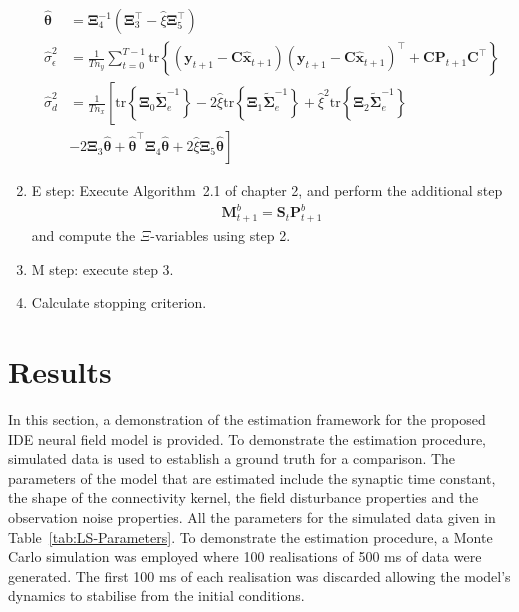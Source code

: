 \documentclass[]{article}
\begin{document}
\begin{algorithm}
\begin{enumerate}
\begin{align}
 \hat{\boldsymbol \theta}&=\boldsymbol\Xi_4^{-1}\left(\boldsymbol\Xi_3^\top-\hat{\xi}\boldsymbol\Xi_5^\top \right)\nonumber\\
\hat{\sigma}_{\epsilon}^2&=\frac{1}{Tn_y}\sum_{t=0}^{T-1}\mathrm{tr}\left\lbrace (\mathbf y_{t+1}-\mathbf C\mathbf{\hat{x}}_{t+1}) (\mathbf y_{t+1}-\mathbf C\mathbf{\hat{x}}_{t+1})^\top+\mathbf C \mathbf P_{t+1}\mathbf C^\top \right\rbrace \nonumber\\
\hat{\sigma}_d^2&=\frac{1}{Tn_x}\left[ \mathrm{tr}\left\lbrace \boldsymbol\Xi_0 \tilde{\boldsymbol\Sigma}_e^{-1}\right\rbrace-
2\hat{\xi}\mathrm{tr}\left\lbrace \boldsymbol\Xi_1 \tilde{\boldsymbol\Sigma}_e^{-1}\right\rbrace +\hat{\xi}^2\mathrm{tr} \left\lbrace\boldsymbol\Xi_2\tilde{\boldsymbol\Sigma}_e^{-1}\right\rbrace\right.\nonumber \\ &\left.-2\boldsymbol\Xi_3\hat{\boldsymbol\theta}+\hat{\boldsymbol\theta}^\top\boldsymbol \Xi_4\hat{\boldsymbol\theta}+2\hat{\xi}\boldsymbol\Xi_5 \hat{\boldsymbol\theta}\right] \nonumber
\end{align}
\item E step: Execute Algorithm~2.1 of chapter 2, and perform the additional step
\begin{align}
\mathbf M_{t +1}^{b}=\mathbf S_t\mathbf P_{t+1}^{b} \nonumber
\end{align}
and compute the $\Xi$-variables using step 2.
\item M step: execute step 3.
\item Calculate stopping criterion.
\end{enumerate}
\end{algorithm}
\section{Results}\label{sec:EM-Results}
In this section, a demonstration of the estimation framework for the proposed IDE neural field model is provided. To demonstrate the estimation procedure, simulated data is used to establish a ground truth for a comparison. The parameters of the model that are estimated include the synaptic time constant, the shape of the connectivity kernel, the field disturbance properties and the observation noise properties. All the parameters for the simulated data given in Table~\ref{tab:LS-Parameters}. To demonstrate the estimation procedure, a Monte Carlo simulation was employed where 100 realisations of 500 ms of data were generated. The first 100 ms of each realisation was discarded allowing the model's dynamics to stabilise from the initial conditions. 
\end{document}
